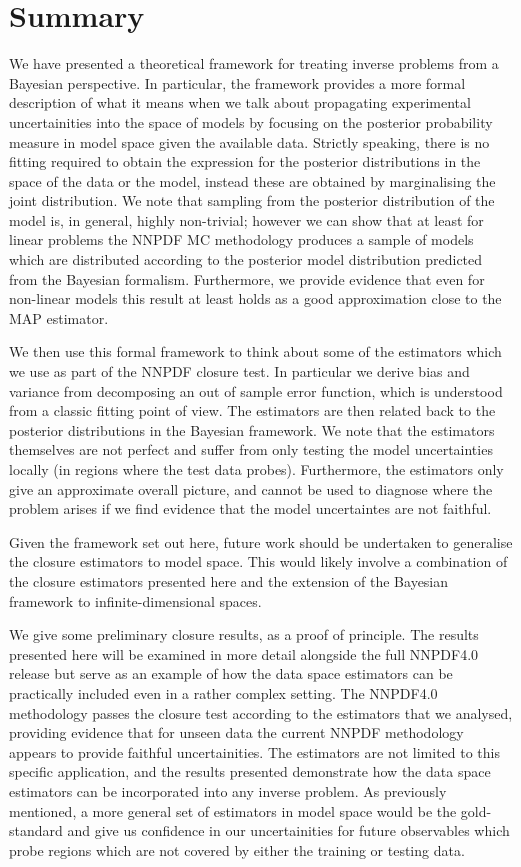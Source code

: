 \section{Summary}

We have presented a theoretical framework for treating inverse problems from a Bayesian
perspective. In particular, the framework provides a more formal description
of what it means when we talk about propagating experimental uncertainities
into the space of models by focusing on the posterior probability measure in model 
space given the available data. Strictly speaking, there is no fitting required to
obtain the expression for the posterior distributions in the space of the
data or the model, instead these are obtained by marginalising the
joint distribution. We note that sampling from the posterior distribution
of the model is,
in general, highly non-trivial; however we can show that at least for linear problems the
NNPDF MC methodology produces a sample of models which are
distributed according to the posterior model distribution predicted from the Bayesian formalism. 
Furthermore, we
provide evidence that even for non-linear models this result at least holds
as a good approximation close to the MAP estimator.

We then use this formal framework to think about some of the estimators which
we use as part of the NNPDF closure test. In particular we derive bias and
variance from decomposing an out of sample error function, which is understood
from a classic fitting point of view. The estimators are then related back to the 
posterior distributions in
the Bayesian framework. We note that the estimators themselves are not perfect
and suffer from only testing the model uncertainties locally (in regions where
the test data probes). Furthermore, the estimators only give an approximate
overall picture, and cannot be used to diagnose where the problem arises if
we find evidence that the model uncertaintes are not faithful.

Given the framework set out here, future work should be undertaken to
generalise the closure estimators to model space. This would likely involve
a combination of the closure estimators presented here and 
the extension of the Bayesian framework to
infinite-dimensional spaces.

We give some preliminary closure results, as a proof of principle. The results
presented here will be examined in more detail alongside the full NNPDF4.0
release but serve as an example of how the data space estimators can be practically
included even in a rather complex setting. The NNPDF4.0 methodology
passes the closure test according to the estimators that we analysed,
providing evidence that for unseen data the current NNPDF methodology
appears to provide faithful uncertainities. The estimators are not limited to
this specific application, and the results presented demonstrate how
the data space estimators can be incorporated into any inverse problem.
As previously mentioned, a more
general set of estimators in model space would be the gold-standard and give
us confidence in our uncertainities for future observables which probe
regions which are not covered by either the training or testing data.

